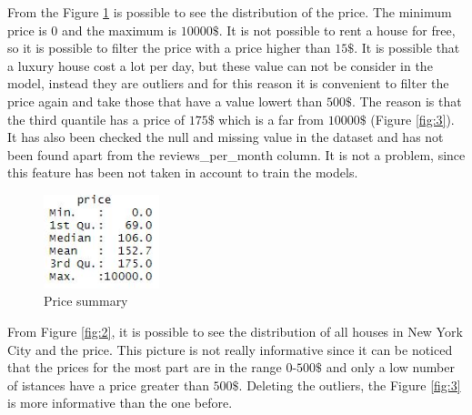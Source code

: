 \documentclass{FR16}
\begin{document}
From the Figure \ref{fig:1} is possible to see the distribution of the price. The minimum price is $0$ and the maximum is $10000\$$. It is not possible to rent a house for free, so it is possible to filter the price with a price higher than $15\$$. It is possible that a luxury house cost a lot per day, but these value can not be consider in the model, instead they are outliers and for this reason it is convenient to filter the price again and take those that have a value lowert than $500\$$. The reason is that the third quantile has a price of $175\$$ which is a far from $10000\$$ (Figure \ref{fig:3}). It has also been checked the null and missing value  in the dataset and has not been found apart from the reviews\_per\_month column. It is not a problem, since this feature has been not taken in account to train the models. 
\\
\begin{figure}[H]
\centering
\includegraphics[width=0.3\textwidth]{figures/figure1.jpg} 
\caption{\label{fig:1}Price summary}
\end{figure}
\noindent From Figure \ref{fig:2}, it is possible to see the distribution of all houses in New York City and the price. This picture is not really informative since it can be noticed that the prices for the most part are in the range $0$-$500\$$ and only a low number of istances have a price greater than $500\$$. Deleting the outliers, the Figure \ref{fig:3} is more informative than the one before.
\end{document}
